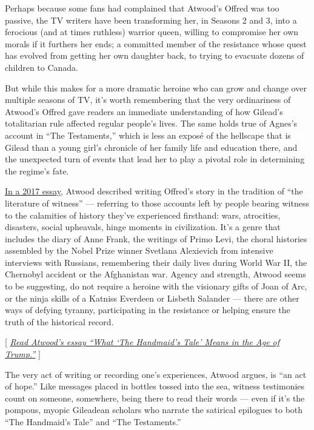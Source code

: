 Perhaps because some fans had complained that Atwood's Offred was too
passive, the TV writers have been transforming her, in Seasons 2 and 3,
into a ferocious (and at times ruthless) warrior queen, willing to
compromise her own morals if it furthers her ends; a committed member of
the resistance whose quest has evolved from getting her own daughter
back, to trying to evacuate dozens of children to Canada.

But while this makes for a more dramatic heroine who can grow and change
over multiple seasons of TV, it's worth remembering that the very
ordinariness of Atwood's Offred gave readers an immediate understanding
of how Gilead's totalitarian rule affected regular people's lives. The
same holds true of Agnes's account in ``The Testaments,'' which is less
an exposé of the hellscape that is Gilead than a young girl's chronicle
of her family life and education there, and the unexpected turn of
events that lead her to play a pivotal role in determining the regime's
fate.

\href{https://www.nytimes3xbfgragh.onion/2017/03/10/books/review/margaret-atwood-handmaids-tale-age-of-trump.html}{In
a 2017 essay}, Atwood described writing Offred's story in the tradition
of ``the literature of witness'' --- referring to those accounts left by
people bearing witness to the calamities of history they've experienced
firsthand: wars, atrocities, disasters, social upheavals, hinge moments
in civilization. It's a genre that includes the diary of Anne Frank, the
writings of Primo Levi, the choral histories assembled by the Nobel
Prize winner Svetlana Alexievich from intensive interviews with
Russians, remembering their daily lives during World War II, the
Chernobyl accident or the Afghanistan war. Agency and strength, Atwood
seems to be suggesting, do not require a heroine with the visionary
gifts of Joan of Arc, or the ninja skills of a Katniss Everdeen or
Lisbeth Salander --- there are other ways of defying tyranny,
participating in the resistance or helping ensure the truth of the
historical record.

{[}
\emph{\href{https://www.nytimes3xbfgragh.onion/2017/03/10/books/review/margaret-atwood-handmaids-tale-age-of-trump.html}{Read
Atwood's essay ``What `The Handmaid's Tale' Means in the Age of
Trump.''}} {]}

The very act of writing or recording one's experiences, Atwood argues,
is ``an act of hope.'' Like messages placed in bottles tossed into the
sea, witness testimonies count on someone, somewhere, being there to
read their words --- even if it's the pompous, myopic Gileadean scholars
who narrate the satirical epilogues to both ``The Handmaid's Tale'' and
``The Testaments.''

